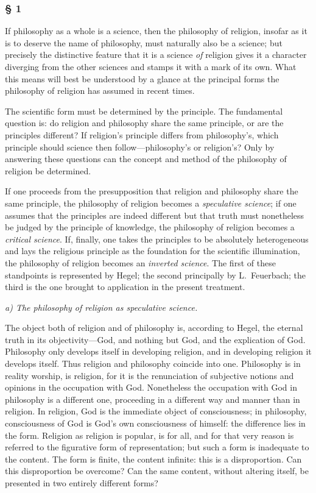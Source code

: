 \documentclass[12pt,a4paper]{article}
\begin{document}
\subsubsection*{§ 1}

If philosophy as a whole is a science, then the philosophy of
religion, insofar as it is to deserve the name of philosophy,
must naturally also be a science; but precisely the distinctive
feature that it is a science \emph{of} religion gives it a
character diverging from the other sciences and stamps it with a
mark of its own. What this means will best be understood by a
glance at the principal forms the philosophy of religion has
assumed in recent times.

The scientific form must be determined by the principle. The
fundamental question is: do religion and philosophy share the
same principle, or are the principles different? If religion's
principle differs from philosophy's, which principle should
science then follow---philosophy's or religion's? Only by
answering these questions can the concept and method of the
philosophy of religion be determined.

If one proceeds from the presupposition that religion and
philosophy share the same principle, the philosophy of religion
becomes a \emph{speculative science}; if one assumes that the
principles are indeed different but that truth must nonetheless
be judged by the principle of knowledge, the philosophy of
religion becomes a \emph{critical science}. If, finally, one
takes the principles to be absolutely heterogeneous and lays the
religious principle as the foundation for the scientific
illumination, the philosophy of religion becomes an
\emph{inverted science}. The first of these standpoints is
represented by Hegel; the second principally by L.\ Feuerbach;
the third is the one brought to application in the present
treatment.

\medskip

\noindent\textit{a) The philosophy of religion as speculative science.}

\medskip

The object both of religion and of philosophy is, according to
Hegel, the eternal truth in its objectivity---God, and nothing
but God, and the explication of God. Philosophy only develops
itself in developing religion, and in developing religion it
develops itself. Thus religion and philosophy coincide into one.
Philosophy is in reality worship, is religion, for it is the
renunciation of subjective notions and opinions in the
occupation with God. Nonetheless the occupation with God in
philosophy is a different one, proceeding in a different way and
manner than in religion. In religion, God is the immediate
object of consciousness; in philosophy, consciousness of God is
God's own consciousness of himself: the difference lies in the
form. Religion as religion is popular, is for all, and for that
very reason is referred to the figurative form of
representation; but such a form is inadequate to the content.
The form is finite, the content infinite: this is a
disproportion. Can this disproportion be overcome? Can the same
content, without altering itself, be presented in two entirely
different forms?
\end{document}
